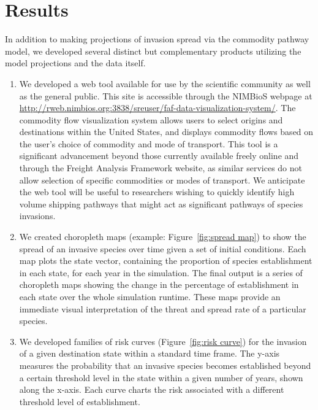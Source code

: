 \documentclass[12pt]{article}
\begin{document}
\section*{Results}

In addition to making projections of invasion spread via the commodity pathway model, we developed several distinct but complementary products utilizing the model projections and the data itself.


\begin{enumerate}

\item  We developed a web tool available for use by the scientific community as well as the general public. This site is accessible through the NIMBioS webpage at \url{http://rweb.nimbios.org:3838/sreuser/faf-data-visualization-system/}. The commodity flow visualization system allows users to select origins and destinations within the United States, and displays commodity flows based on the user's choice of commodity and mode of transport. This tool is a significant advancement beyond those currently available freely online and through the Freight Analysis Framework website, as similar services do not allow selection of specific commodities or modes of transport. We anticipate the web tool will be useful to researchers wishing to quickly identify high volume shipping pathways that might act as significant pathways of species invasions. 

\item We created choropleth maps (example: Figure~\ref{fig:spread map}) to show the spread of an invasive species over time given a set of initial conditions. Each map plots the state vector, containing the proportion of species establishment in each state, for each year in the simulation. The final output is a series of choropleth maps showing the change in the percentage of establishment in each state over the whole simulation runtime. These maps provide an immediate visual interpretation of the threat and spread rate of a particular species. 

\item We developed families of risk curves (Figure~\ref{fig:risk curve}) for the invasion of a given destination state within a standard time frame. The y-axis measures the probability that an invasive species becomes established beyond a certain threshold level in the state within a given number of years, shown along the x-axis. Each curve charts the risk associated with a different threshold level of establishment.

\end{enumerate}
\end{document}
